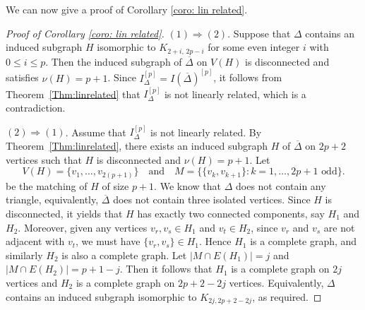 \documentclass[12pt]{amsart}
\begin{document}

We can now give a proof of Corollary \ref{coro: lin related}.

\begin{proof}[Proof of Corollary \ref{coro: lin related}]
$(1) \Rightarrow (2)$.  
Suppose that $\Delta$ contains an induced subgraph $H$ isomorphic to $K_{2+i,\,2p-i}$ for some even integer $i$ with $0 \leq i \leq p$. Then the induced subgraph of $\overline{\Delta}$ on $V(H)$ is disconnected and satisfies $\nu(H)=p+1$. Since $I_{\Delta}^{[p]} = I(\overline{\Delta})^{[p]}$, it follows from Theorem~\ref{Thm:linrelated} that $I_{\Delta}^{[p]}$ is not linearly related, which is a contradiction.

$(2) \Rightarrow (1)$.  
Assume that $I_{\Delta}^{[p]}$ is not linearly related. By Theorem~\ref{Thm:linrelated}, there exists an induced subgraph $H$ of $\overline{\Delta}$ on $2p+2$ vertices such that $H$ is disconnected and $\nu(H)=p+1$. Let
\[
V(H)=\{v_1,\dots, v_{2(p+1)}\}
\quad \text{and} \quad
M=\bigl\{\{v_k,v_{k+1}\} : k=1,\dots,2p+1 \text{ odd}\bigr\}.
\]
be the matching of $H$ of size $p+1$. We know that $\Delta$ does not contain any triangle, equivalently, $\overline{\Delta}$ does not contain three isolated vertices. Since $H$ is disconnected, it yields that $H$ has exactly two connected components, say $H_1$ and $H_2$. Moreover, given any vertices $v_r, v_s  \in H_1$ and $v_t \in H_2$, since $v_r$ and $v_s$ are not adjacent with $v_t$, we must have $\{v_r,v_s\} \in H_1$. Hence $H_1$ is a complete graph, and similarly $H_2$ is also a complete graph. Let $|M\cap E(H_1)| = j$ and $|M\cap E(H_2)| = p+1-j$. Then it follows that $H_1$ is a complete graph on $2j$ vertices and $H_2$ is a complete graph on $2p+2-2j$ vertices. Equivalently, $\Delta$ contains an induced subgraph isomorphic to $K_{2j, 2p+2-2j}$, as required.
\end{proof}
\end{document}
